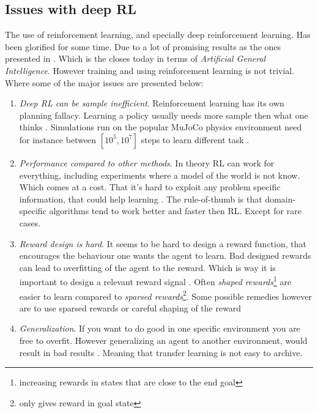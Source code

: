 \documentclass{kththesis}
\theoremstyle{definition}
\begin{document}


\subsection{Issues with deep RL}
The use of reinforcement learning, and specially deep reinforcement learning. Has been glorified for some time. Due to a lot of promising results as the ones presented in \textcite{silver2016mastering, silver2017mastering}. Which is the closes today in terms of \textit{Artificial General Intelligence}. However training and using reinforcement learning is not trivial. Where some of the major issues are presented below:

\begin{enumerate}
    \item \textit{Deep RL can be sample inefficient}. Reinforcement learning has its own planning fallacy. Learning a policy usually needs more sample then what one thinks \parencite{irpan_2018}. Simulations run on the popular MuJoCo physics environment need for instance between $[10^5, 10^7]$ steps to learn different task \parencite{heess2017emergence}.
    
    \item \textit{Performance compared to other methods}. In theory RL can work for everything, including experiments where a model of the world is not know. Which comes at a cost. That it's hard to exploit any problem specific information, that could help learning \parencite{irpan_2018}. The rule-of-thumb is that domain-specific algorithms tend to work better and faster then RL. Except for rare cases.
    
    \item \textit{Reward design is hard}. It seems to be hard to design a reward function, that encourages the behaviour one wants the agent to learn. Bad designed rewards can lead to overfitting of the agent to the reward. Which is way it is important to design a relevant reward signal \parencite{sutton1998reinforcement, irpan_2018}. Often \textit{shaped rewards}\footnote{increasing rewards in states that are close to the end goal} are easier to learn compared to \textit{sparsed rewards}\footnote{only gives reward in goal state}. Some possible remedies however are to use sparsed rewards or careful shaping of the reward \parencite{irpan_2018}
    
    \item \textit{Generalization}. If you want to do good in one specific environment you are free to overfit. However generalizing an agent to another environment, would result in bad results \parencite{irpan_2018}. Meaning that transfer learning is not easy to archive. 
    
\end{enumerate}
\end{document}
